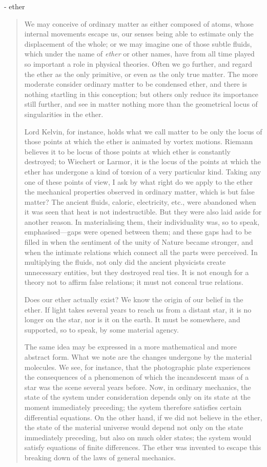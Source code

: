  - ether
 
 \begin{quote}
     We may conceive of ordinary matter as either composed of atoms, whose internal movements escape us, our senses being able to estimate only the displacement of the whole; or we may imagine one of those subtle fluids, which under the name of \emph{ether} or other names, have from all time played so important a role in physical theories.  Often we go further, and regard the ether as the only primitive, or even as the only true matter.  The more moderate consider ordinary matter to be condensed ether, and there is nothing startling in this conception; but others only reduce its importance still further, and see in matter nothing more than the geometrical locus of singularities in the ether.  
     
     Lord Kelvin, for instance, holds what we call matter to be only the locus of those points at which the ether is animated by vortex motions.  Riemann believes it to be locus of those points at which ether is constantly destroyed; to Wiechert or Larmor, it is the locus of the points at which the ether has undergone a kind of torsion of a very particular kind.  Taking any one of these points of view, I ask by what right do we apply to the ether the mechanical properties observed in ordinary matter, which is but false matter?  The ancient fluids, caloric, electricity, etc., were abandoned when it was seen that heat is not indestructible.  But they were also laid aside for another reason.  In materialising them, their individuality was, so to speak, emphasised---gaps were opened between them; and these gaps had to be filled in when the sentiment of the unity of Nature became stronger, and when the intimate relations which connect all the parts were perceived.  In multiplying the fluids, not only did the ancient physicists create unnecessary entities, but they destroyed real ties.  It is not enough for a theory not to affirm false relations; it must not conceal true relations.  
     
     Does our ether actually exist?  We know the origin of our belief in the ether.  If light takes several years to reach us from a distant star, it is no longer on the star, nor is it on the earth.  It must be somewhere, and supported, so to speak, by some material agency.
     
     The same idea may be expressed in a more mathematical and more abstract form.  What we note are the changes undergone by the material molecules.  We see, for instance, that the photographic plate experiences the consequences of a phenomenon of which the incandescent mass of a star was the scene several years before.  Now, in ordinary mechanics, the state of the system under consideration depends only on its state at the moment immediately preceding; the system therefore satisfies certain differential equations.  On the other hand, if we did not believe in the ether, the state of the material universe would depend not only on the state immediately preceding, but also on much older states; the system would satisfy equations of finite differences.  The ether was invented to escape this breaking down of the laws of general mechanics.  
     

\end{quote}
